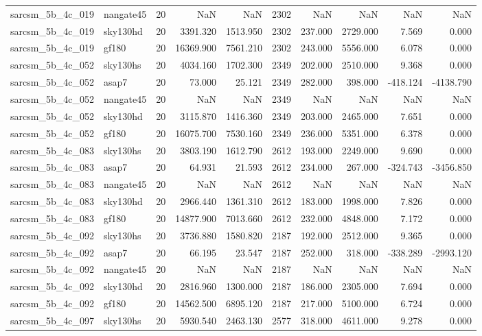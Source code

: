 \begin{tabular}{llrrrrrrrr}
sarcsm\_5b\_4c\_019 & nangate45 & 20 & NaN & NaN & 2302 & NaN & NaN & NaN & NaN \\
sarcsm\_5b\_4c\_019 & sky130hd & 20 & 3391.320 & 1513.950 & 2302 & 237.000 & 2729.000 & 7.569 & 0.000 \\
sarcsm\_5b\_4c\_019 & gf180 & 20 & 16369.900 & 7561.210 & 2302 & 243.000 & 5556.000 & 6.078 & 0.000 \\
sarcsm\_5b\_4c\_052 & sky130hs & 20 & 4034.160 & 1702.300 & 2349 & 202.000 & 2510.000 & 9.368 & 0.000 \\
sarcsm\_5b\_4c\_052 & asap7 & 20 & 73.000 & 25.121 & 2349 & 282.000 & 398.000 & -418.124 & -4138.790 \\
sarcsm\_5b\_4c\_052 & nangate45 & 20 & NaN & NaN & 2349 & NaN & NaN & NaN & NaN \\
sarcsm\_5b\_4c\_052 & sky130hd & 20 & 3115.870 & 1416.360 & 2349 & 203.000 & 2465.000 & 7.651 & 0.000 \\
sarcsm\_5b\_4c\_052 & gf180 & 20 & 16075.700 & 7530.160 & 2349 & 236.000 & 5351.000 & 6.378 & 0.000 \\
sarcsm\_5b\_4c\_083 & sky130hs & 20 & 3803.190 & 1612.790 & 2612 & 193.000 & 2249.000 & 9.690 & 0.000 \\
sarcsm\_5b\_4c\_083 & asap7 & 20 & 64.931 & 21.593 & 2612 & 234.000 & 267.000 & -324.743 & -3456.850 \\
sarcsm\_5b\_4c\_083 & nangate45 & 20 & NaN & NaN & 2612 & NaN & NaN & NaN & NaN \\
sarcsm\_5b\_4c\_083 & sky130hd & 20 & 2966.440 & 1361.310 & 2612 & 183.000 & 1998.000 & 7.826 & 0.000 \\
sarcsm\_5b\_4c\_083 & gf180 & 20 & 14877.900 & 7013.660 & 2612 & 232.000 & 4848.000 & 7.172 & 0.000 \\
sarcsm\_5b\_4c\_092 & sky130hs & 20 & 3736.880 & 1580.820 & 2187 & 192.000 & 2512.000 & 9.365 & 0.000 \\
sarcsm\_5b\_4c\_092 & asap7 & 20 & 66.195 & 23.547 & 2187 & 252.000 & 318.000 & -338.289 & -2993.120 \\
sarcsm\_5b\_4c\_092 & nangate45 & 20 & NaN & NaN & 2187 & NaN & NaN & NaN & NaN \\
sarcsm\_5b\_4c\_092 & sky130hd & 20 & 2816.960 & 1300.000 & 2187 & 186.000 & 2305.000 & 7.694 & 0.000 \\
sarcsm\_5b\_4c\_092 & gf180 & 20 & 14562.500 & 6895.120 & 2187 & 217.000 & 5100.000 & 6.724 & 0.000 \\
sarcsm\_5b\_4c\_097 & sky130hs & 20 & 5930.540 & 2463.130 & 2577 & 318.000 & 4611.000 & 9.278 & 0.000 \\

\end{tabular}
